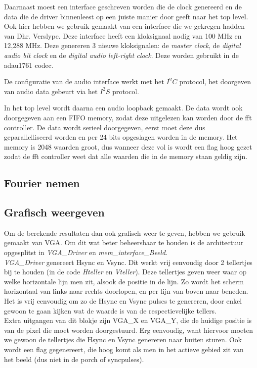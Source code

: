 \documentclass[a4paper,kul]{kulakarticle} %
\begin{document}
Daarnaast moest een interface geschreven worden die de clock genereerd en de data die de driver binnenleest op een juiste manier door geeft naar het top level. Ook hier hebben we gebruik gemaakt van een interface die we gekregen hadden van Dhr. Verslype. Deze interface heeft een kloksignaal nodig van 100 MHz en 12,288 MHz. Deze genereren 3 nieuwe kloksignalen: de \textit{master clock}, de \textit{digital audio bit clock} en de \textit{digital audio left-right clock}. Deze worden gebruikt in de adau1761 codec. \newline

De configuratie van de audio interface werkt met het $I^2C$ protocol, het doorgeven van audio data gebeurt via het $I^2S$ protocol.\newline

In het top level wordt daarna een audio loopback gemaakt. De data wordt ook doorgegeven aan een FIFO memory, zodat deze uitgelezen kan worden door de fft controller. De data wordt serieel doorgegeven, eerst moet deze dus geparallelliseerd worden en per 24 bits opgeslagen worden in de memory. Het memory is 2048 waarden groot, dus wanneer deze vol is wordt een flag hoog gezet zodat de fft controller weet dat alle waarden die in de memory staan geldig zijn. 

\subsection{Fourier nemen}

\subsection{Grafisch weergeven}
Om de berekende resultaten dan ook grafisch weer te geven, hebben we gebruik gemaakt van VGA. Om dit wat beter beheersbaar te houden is de architectuur opgesplitst in \textit{VGA\_Driver} en \textit{mem\_interface\_Beeld}.\\

\textit{VGA\_Driver} genereert Hsync en Vsync. Dit werkt vrij eenvoudig door 2 tellertjes bij te houden (in de code \textit{Hteller} en \textit{Vteller}). Deze tellertjes geven weer waar op welke horizontale lijn men zit, alsook de positie in de lijn. Zo wordt het scherm horizontaal van links naar rechts doorlopen, en per lijn van boven naar beneden. Het is vrij eenvoudig om zo de Hsync en Vsync pulses te genereren, door enkel gewoon te gaan kijken wat de waarde is van de respectievelijke tellers.\\
Extra uitgangen van dit blokje zijn VGA\_X en VGA\_Y, die de huidige positie is van de pixel die moet worden doorgestuurd. Erg eenvoudig, want hiervoor moeten we gewoon de tellertjes die Hsync en Vsync genereren naar buiten sturen. Ook wordt een flag gegenereert, die hoog komt als men in het actieve gebied zit van het beeld (dus niet in de porch of syncpulses).\\
\end{document}
